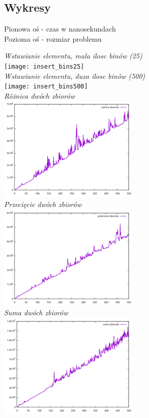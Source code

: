 \documentclass{article}
\begin{document}
\subsection*{Wykresy}
Pionowa oś - czas w nanosekundach\\
Pozioma oś - rozmiar problemu\\
\begin{center}
    \textit{Wstawianie elementu, mala ilosc binów (25)\\}
    \texttt{[image: insert\_bins25]}\\
    \textit{Wstawianie elementu, duza ilosc binów (500)\\}
    \texttt{[image: insert\_bins500]}\\
    \textit{Różnica dwóch zbiorów\\}
    \includegraphics[width=0.5\textwidth]{difference}\\
    \textit{Przecięcie dwóch zbiorów\\}
    \includegraphics[width=0.5\textwidth]{intersection}\\
    \textit{Suma dwóch zbiorów\\}
    \includegraphics[width=0.5\textwidth]{unify}\\
\end{center}
\end{document}
